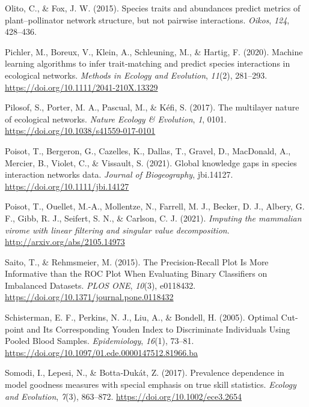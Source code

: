 \documentclass[11pt]{article}
\newlength{\cslhangindent}
\newenvironment{CSLReferences}[2] %
 {%
  \setlength{\parindent}{0pt}
  \ifodd #1 \everypar{\setlength{\hangindent}{\cslhangindent}}\ignorespaces\fi
  \ifnum #2 > 0
  \setlength{\parskip}{#2\baselineskip}
  \fi
 }%
 {}
\begin{document}
\begin{CSLReferences}{1}{0}
\leavevmode{}%
Olito, C., \& Fox, J. W. (2015). Species traits and abundances predict
metrics of plant--pollinator network structure, but not pairwise
interactions. \emph{Oikos}, \emph{124}, 428--436.

\leavevmode{}%
Pichler, M., Boreux, V., Klein, A., Schleuning, M., \& Hartig, F.
(2020). Machine learning algorithms to infer trait‐matching and predict
species interactions in ecological networks. \emph{Methods in Ecology
and Evolution}, \emph{11}(2), 281--293.
\url{https://doi.org/10.1111/2041-210X.13329}

\leavevmode{}%
Pilosof, S., Porter, M. A., Pascual, M., \& Kéfi, S. (2017). The
multilayer nature of ecological networks. \emph{Nature Ecology \&
Evolution}, \emph{1}, 0101.
\url{https://doi.org/10.1038/s41559-017-0101}

\leavevmode{}%
Poisot, T., Bergeron, G., Cazelles, K., Dallas, T., Gravel, D.,
MacDonald, A., Mercier, B., Violet, C., \& Vissault, S. (2021). Global
knowledge gaps in species interaction networks data. \emph{Journal of
Biogeography}, jbi.14127. \url{https://doi.org/10.1111/jbi.14127}

\leavevmode{}%
Poisot, T., Ouellet, M.-A., Mollentze, N., Farrell, M. J., Becker, D.
J., Albery, G. F., Gibb, R. J., Seifert, S. N., \& Carlson, C. J.
(2021). \emph{Imputing the mammalian virome with linear filtering and
singular value decomposition}. \url{http://arxiv.org/abs/2105.14973}

\leavevmode{}%
Saito, T., \& Rehmsmeier, M. (2015). The Precision-Recall Plot Is More
Informative than the ROC Plot When Evaluating Binary Classifiers on
Imbalanced Datasets. \emph{PLOS ONE}, \emph{10}(3), e0118432.
\url{https://doi.org/10.1371/journal.pone.0118432}

\leavevmode{}%
Schisterman, E. F., Perkins, N. J., Liu, A., \& Bondell, H. (2005).
Optimal Cut-point and Its Corresponding Youden Index to Discriminate
Individuals Using Pooled Blood Samples. \emph{Epidemiology},
\emph{16}(1), 73--81.
\url{https://doi.org/10.1097/01.ede.0000147512.81966.ba}

\leavevmode{}%
Somodi, I., Lepesi, N., \& Botta‐Dukát, Z. (2017). Prevalence dependence
in model goodness measures with special emphasis on true skill
statistics. \emph{Ecology and Evolution}, \emph{7}(3), 863--872.
\url{https://doi.org/10.1002/ece3.2654}


\end{CSLReferences}
\end{document}

